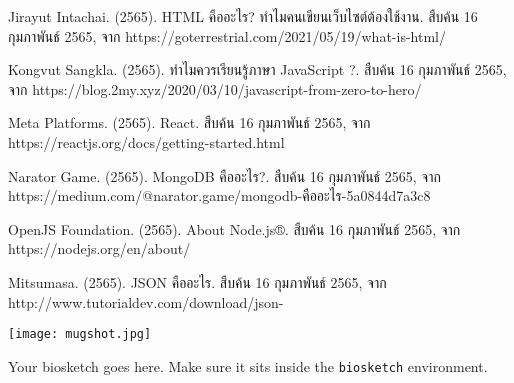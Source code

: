 \documentclass[semifinal,survey]{cpecmu}
\author{นายเจษฎา จินะกะ}{Jetsada Jinaka}{620612144}
\author{นายเอื้อบุญ เรือนคำฟู}{Aueboon Ruanekamfu}{620612170}
\begin{document}


\pagestyle{empty}\cleardoublepage
\normalspacing \setcounter{page}{1}  \pagestyle{cpecmu}





\ifproject

\fi

% 
\begin{thebibliography}{1}
   
  Jirayut Intachai. (2565). HTML คืออะไร? ทำไมคนเขียนเว็บไซต์ต้องใช้งาน. สืบค้น 16 กุมภาพันธ์ 2565,
  จาก https://goterrestrial.com/2021/05/19/what-is-html/

  Kongvut Sangkla. (2565). ทำไมควรเรียนรู้ภาษา JavaScript ?. สืบค้น 16 กุมภาพันธ์ 2565,
  จาก https://blog.2my.xyz/2020/03/10/javascript-from-zero-to-hero/

  Meta Platforms. (2565).  React. สืบค้น 16 กุมภาพันธ์ 2565,
  จาก https://reactjs.org/docs/getting-started.html
  
  Narator Game. (2565). MongoDB คืออะไร?. สืบค้น 16 กุมภาพันธ์ 2565,
  จาก https://medium.com/@narator.game/mongodb-คืออะไร-5a0844d7a3c8
  
  OpenJS Foundation. (2565).  About Node.js®. สืบค้น 16 กุมภาพันธ์ 2565,
  จาก https://nodejs.org/en/about/
  
  Mitsumasa. (2565). JSON คืออะไร. สืบค้น 16 กุมภาพันธ์ 2565,
  จาก http://www.tutorialdev.com/download/json-%

\end{thebibliography}

\ifproject
\appendix


\ifglossary\glossarypage\fi

\ifindex\indexpage\fi

\begin{biosketch}
\begin{center}
  \texttt{[image: mugshot.jpg]}
\end{center}
Your biosketch goes here. Make sure it sits inside
the \texttt{biosketch} environment.
\end{biosketch}
\fi %
\end{document}
